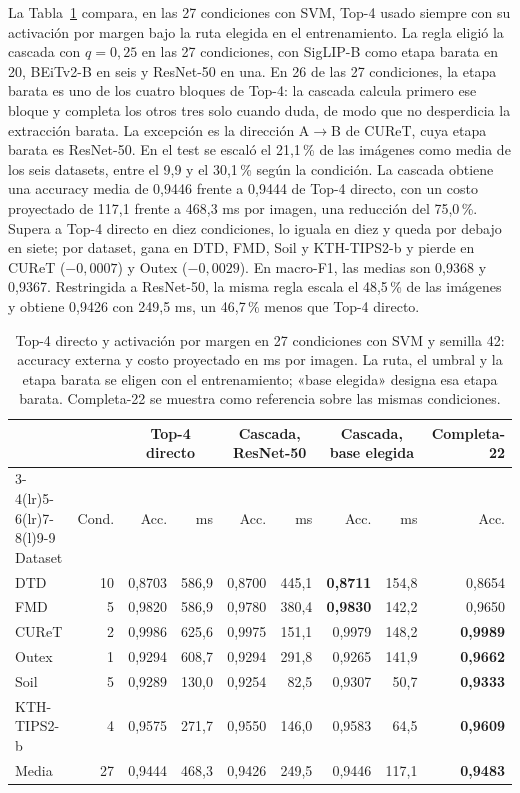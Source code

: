 \documentclass[a4paper,fleqn]{cas-sc}
\begin{document}
La Tabla~\ref{tab:cascada} compara, en las 27 condiciones con SVM, Top-4 usado siempre con su activación por margen bajo la ruta elegida en el entrenamiento. La regla eligió la cascada con $q=0{,}25$ en las 27 condiciones, con SigLIP-B como etapa barata en 20, BEiTv2-B en seis y ResNet-50 en una. En 26 de las 27 condiciones, la etapa barata es uno de los cuatro bloques de Top-4: la cascada calcula primero ese bloque y completa los otros tres solo cuando duda, de modo que no desperdicia la extracción barata. La excepción es la dirección A$\to$B de CUReT, cuya etapa barata es ResNet-50. En el test se escaló el 21,1\,\% de las imágenes como media de los seis datasets, entre el 9,9 y el 30,1\,\% según la condición. La cascada obtiene una accuracy media de 0,9446 frente a 0,9444 de Top-4 directo, con un costo proyectado de 117,1 frente a 468,3 ms por imagen, una reducción del 75,0\,\%. Supera a Top-4 directo en diez condiciones, lo iguala en diez y queda por debajo en siete; por dataset, gana en DTD, FMD, Soil y KTH-TIPS2-b y pierde en CUReT ($-0{,}0007$) y Outex ($-0{,}0029$). En macro-F1, las medias son 0,9368 y 0,9367. Restringida a ResNet-50, la misma regla escala el 48,5\,\% de las imágenes y obtiene 0,9426 con 249,5 ms, un 46,7\,\% menos que Top-4 directo.

\begin{table}[pos=htbp]
\centering
\caption{Top-4 directo y activación por margen en 27 condiciones con SVM y semilla 42: accuracy externa y costo proyectado en ms por imagen. La ruta, el umbral y la etapa barata se eligen con el entrenamiento; «base elegida» designa esa etapa barata. Completa-22 se muestra como referencia sobre las mismas condiciones.}
\label{tab:cascada}
\small
\setlength{\tabcolsep}{4.5pt}
\begin{tabular}{@{}lrrrrrrrr@{}}
\toprule
 & & \multicolumn{2}{c}{Top-4 directo} & \multicolumn{2}{c}{Cascada, ResNet-50} & \multicolumn{2}{c}{Cascada, base elegida} & Completa-22 \\
\cmidrule(lr){3-4}\cmidrule(lr){5-6}\cmidrule(lr){7-8}\cmidrule(l){9-9}
Dataset & Cond. & Acc. & ms & Acc. & ms & Acc. & ms & Acc. \\
\midrule
DTD & 10 & 0,8703 & 586,9 & 0,8700 & 445,1 & \textbf{0,8711} & 154,8 & 0,8654 \\
FMD & 5 & 0,9820 & 586,9 & 0,9780 & 380,4 & \textbf{0,9830} & 142,2 & 0,9650 \\
CUReT & 2 & 0,9986 & 625,6 & 0,9975 & 151,1 & 0,9979 & 148,2 & \textbf{0,9989} \\
Outex & 1 & 0,9294 & 608,7 & 0,9294 & 291,8 & 0,9265 & 141,9 & \textbf{0,9662} \\
Soil & 5 & 0,9289 & 130,0 & 0,9254 & 82,5 & 0,9307 & 50,7 & \textbf{0,9333} \\
KTH-TIPS2-b & 4 & 0,9575 & 271,7 & 0,9550 & 146,0 & 0,9583 & 64,5 & \textbf{0,9609} \\
\midrule
Media & 27 & 0,9444 & 468,3 & 0,9426 & 249,5 & 0,9446 & 117,1 & \textbf{0,9483} \\
\bottomrule
\end{tabular}
\end{table}
\end{document}
